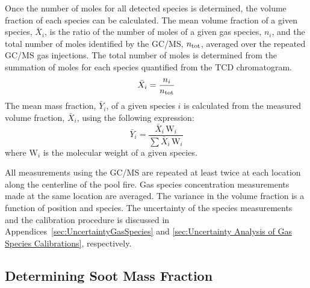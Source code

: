 \documentclass[12pt]{article}
\begin{document}
Once the number of moles for all detected species is determined, the volume fraction of each species can be calculated. The mean volume fraction of a given species, $\bar{X}_{i}$, is the ratio of the number of moles of a given gas species, $n_{i}$, and the total number of moles identified by the GC/MS, $n_{\rm tot}$, averaged over the repeated GC/MS gas injections. The total number of moles is determined from the summation of moles for each species quantified from the TCD chromatogram.
\begin{equation}\label{eq:volume_fraction}
  	\bar{X}_{i}= \frac{n_{i}}{n_{\rm tot}}
\end{equation}
The mean mass fraction, $\bar{Y}_{i}$, of a given species $i$ is calculated from the measured volume fraction, $\bar{X}_{i}$, using the following expression:
\begin{equation}\label{eq:mass_fraction}
	\bar{Y}_{i}=\frac{\bar{X}_{i} \, {\textrm{W}_{i}}}{\sum{\bar{X}_{i} \, {\textrm{W}_{i}}}}
\end{equation}
where ${{\textrm{W}_{i}}}$ is the molecular weight of a given species.

All measurements using the GC/MS are repeated at least twice at each location along the centerline of the pool fire. Gas species concentration measurements made at the same location are averaged. The variance in the volume fraction is a function of position and species. The uncertainty of the species measurements and the calibration procedure is discussed in Appendices~\ref{sec:UncertaintyGasSpecies} and \ref{sec:Uncertainty Analysis of Gas Species Calibrations}, respectively.

\subsection{Determining Soot Mass Fraction}
\label{ssec:Soot_Setup}
\end{document}
